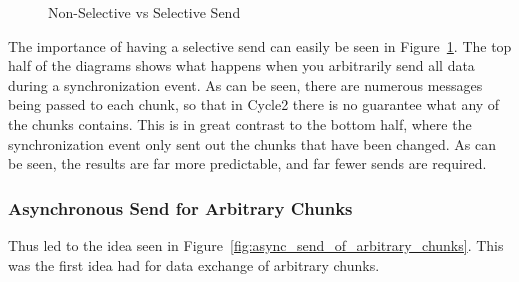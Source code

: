 \documentclass[../thesis.tex]{subfiles}
\begin{document}
\begin{figure}[htbp]

      \caption{Non-Selective vs Selective Send}
      \label{fig:selective_send}
    \end{figure}

    The importance of having a selective send can easily be seen in Figure~\ref{fig:selective_send}. The top half of the diagrams shows what happens when you arbitrarily send all data during a synchronization event. As can be seen, there are numerous messages being passed to each chunk, so that in Cycle2 there is no guarantee what any of the chunks contains. This is in great contrast to the bottom half, where the synchronization event only sent out the chunks that have been changed. As can be seen, the results are far more predictable, and far fewer sends are required.


  \subsubsection{Asynchronous Send for Arbitrary Chunks} %
  \label{ssub:asynchronous_send_for_arbitrary_chunks}
   

    Thus led to the idea seen in Figure~\ref{fig:async_send_of_arbitrary_chunks}. This was the first idea had for data exchange of arbitrary chunks.
\end{document}
